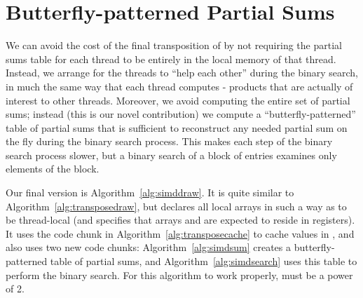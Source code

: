 \documentclass[10pt,nohyperref]{sigplanconf}
\begin{document}
\section{Butterfly-patterned Partial Sums}


We can avoid the cost of the final transposition of  by not requiring the partial sums table 
for each thread to be entirely in the local memory of that thread.  Instead, we arrange for the
threads to ``help each other'' during the binary search, in much the same way that
each thread computes - products that are actually of interest to other threads.
Moreover, we avoid computing the entire set of partial sums; instead (this is our novel contribution) we compute a
``butterfly-patterned'' table of partial sums that is sufficient to reconstruct any
needed partial sum on the fly during the binary search process.  This makes each step of
the binary search process slower, but a binary search
of a block of  entries examines only  elements of the block.

Our final version is Algorithm~\ref{alg:simddraw}.  It is quite similar to Algorithm~\ref{alg:transposedraw},
but declares all local arrays in such a way as to be thread-local (and specifies that arrays  and 
are expected to reside in registers).  It uses the code chunk in Algorithm~\ref{alg:transposecache}
to cache  values in , and also uses two new code chunks:
Algorithm~\ref{alg:simdsum} creates a butterfly-patterned table of partial sums, and
Algorithm~\ref{alg:simdsearch} uses this table to perform the binary search.
For this algorithm to work properly,  must be a power of 2.
\end{document}
